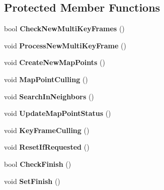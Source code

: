 \subsection*{Protected Member Functions}
\begin{DoxyCompactItemize}
\item 
bool {\bfseries Check\+New\+Multi\+Key\+Frames} ()\hypertarget{classMultiColSLAM_1_1cLocalMapping_a1ba395945f556da6a3396dd2fcc0dc7c}{}\label{classMultiColSLAM_1_1cLocalMapping_a1ba395945f556da6a3396dd2fcc0dc7c}

\item 
void {\bfseries Process\+New\+Multi\+Key\+Frame} ()\hypertarget{classMultiColSLAM_1_1cLocalMapping_a749594b049b2d19a9f673ebac52064fd}{}\label{classMultiColSLAM_1_1cLocalMapping_a749594b049b2d19a9f673ebac52064fd}

\item 
void {\bfseries Create\+New\+Map\+Points} ()\hypertarget{classMultiColSLAM_1_1cLocalMapping_a41061fca748ae421fae7aaa1497b773c}{}\label{classMultiColSLAM_1_1cLocalMapping_a41061fca748ae421fae7aaa1497b773c}

\item 
void {\bfseries Map\+Point\+Culling} ()\hypertarget{classMultiColSLAM_1_1cLocalMapping_a7455c34a98098a7a0e0a9d4f93706a4f}{}\label{classMultiColSLAM_1_1cLocalMapping_a7455c34a98098a7a0e0a9d4f93706a4f}

\item 
void {\bfseries Search\+In\+Neighbors} ()\hypertarget{classMultiColSLAM_1_1cLocalMapping_aa9187dea62aa55751996ab736683181b}{}\label{classMultiColSLAM_1_1cLocalMapping_aa9187dea62aa55751996ab736683181b}

\item 
void {\bfseries Update\+Map\+Point\+Status} ()\hypertarget{classMultiColSLAM_1_1cLocalMapping_a83ae4a5a1ff327a9bd2453a52745c297}{}\label{classMultiColSLAM_1_1cLocalMapping_a83ae4a5a1ff327a9bd2453a52745c297}

\item 
void {\bfseries Key\+Frame\+Culling} ()\hypertarget{classMultiColSLAM_1_1cLocalMapping_a23ac1f436a4c5fa9bf211eb1ec6928e9}{}\label{classMultiColSLAM_1_1cLocalMapping_a23ac1f436a4c5fa9bf211eb1ec6928e9}

\item 
void {\bfseries Reset\+If\+Requested} ()\hypertarget{classMultiColSLAM_1_1cLocalMapping_a0c792f7b1bdcea7e8b7de46e98807bf9}{}\label{classMultiColSLAM_1_1cLocalMapping_a0c792f7b1bdcea7e8b7de46e98807bf9}

\item 
bool {\bfseries Check\+Finish} ()\hypertarget{classMultiColSLAM_1_1cLocalMapping_ad925c13cabde3a8d450ce326b022d116}{}\label{classMultiColSLAM_1_1cLocalMapping_ad925c13cabde3a8d450ce326b022d116}

\item 
void {\bfseries Set\+Finish} ()\hypertarget{classMultiColSLAM_1_1cLocalMapping_a47fa50a682ff0847528d60f5841eb3ac}{}\label{classMultiColSLAM_1_1cLocalMapping_a47fa50a682ff0847528d60f5841eb3ac}

\end{DoxyCompactItemize}

